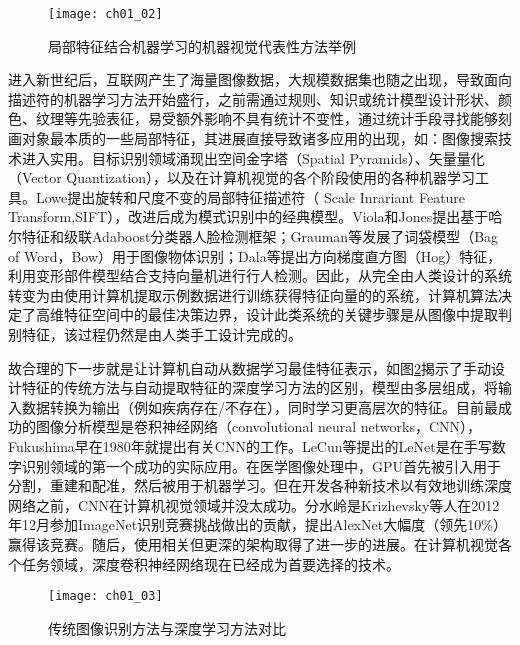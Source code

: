 \begin{figure}[!htbp]
    \centering
    \texttt{[image: ch01\_02]}
    \caption{局部特征结合机器学习的机器视觉代表性方法举例}
    \label{fig:ch01_02}
\end{figure}

进入新世纪后，互联网产生了海量图像数据，大规模数据集也随之出现，导致面向描述符的机器学习方法开始盛行，之前需通过规则、知识或统计模型设计形状、颜色、纹理等先验表征，易受额外影响不具有统计不变性，通过统计手段寻找能够刻画对象最本质的一些局部特征，其进展直接导致诸多应用的出现，如：图像搜索技术进入实用。目标识别领域涌现出空间金字塔（Spatial Pyramids）\citep{Lazebnik2006}、矢量量化（Vector Quantization）\citep{Yang2009b}，以及在计算机视觉的各个阶段使用的各种机器学习工具。Lowe\citep{Lowe2004}提出旋转和尺度不变的局部特征描述符（ Scale Inrariant Feature Transform,SIFT），改进后成为模式识别中的经典模型。Viola和Jones\citep{Viola2001}提出基于哈尔特征和级联Adaboost分类器人脸检测框架；Grauman等\citep{Grauman2005}发展了词袋模型（Bag of Word，Bow）用于图像物体识别；Dala等\citep{Dalal2005}提出方向梯度直方图（Hog）特征，利用变形部件模型结合支持向量机进行行人检测。因此，从完全由人类设计的系统转变为由使用计算机提取示例数据进行训练获得特征向量的的系统，计算机算法决定了高维特征空间中的最佳决策边界，设计此类系统的关键步骤是从图像中提取判别特征，该过程仍然是由人类手工设计完成的。

故合理的下一步就是让计算机自动从数据学习最佳特征表示，如图\ref{fig:ch01_03}揭示了手动设计特征的传统方法与自动提取特征的深度学习方法的区别，模型由多层组成，将输入数据转换为输出（例如疾病存在/不存在），同时学习更高层次的特征。目前最成功的图像分析模型是卷积神经网络（convolutional neural networks，CNN），Fukushima早在1980年就提出有关CNN的工作\citep{Fukushima1982Neocognitron}。LeCun等\citep{Lecun1990Handwritten}提出的LeNet是在手写数字识别领域的第一个成功的实际应用。在医学图像处理中，GPU首先被引入用于分割，重建和配准，然后被用于机器学习。但在开发各种新技术以有效地训练深度网络之前，CNN在计算机视觉领域并没太成功。分水岭是Krizhevsky等人\citep{Krizhevsky2012}在2012年12月参加ImageNet\citep{Russakovsky}识别竞赛挑战做出的贡献，提出AlexNet大幅度（领先10\%）赢得该竞赛。随后，使用相关但更深的架构取得了进一步的进展\citep{Simonyan2014a,Szegedy2015,he15}。在计算机视觉各个任务领域，深度卷积神经网络现在已经成为首要选择的技术。
\begin{figure}[!htbp]
    \centering
    \texttt{[image: ch01\_03]}
    \caption{传统图像识别方法与深度学习方法对比}
    \label{fig:ch01_03}
\end{figure}

